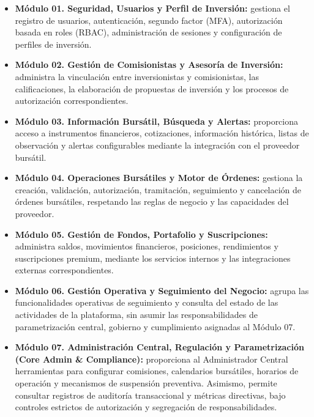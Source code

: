 \documentclass[11pt,a4paper,oneside]{article}
\begin{document}
\begin{itemize}

    \item \textbf{Módulo 01. Seguridad, Usuarios y Perfil
    de Inversión:}
    gestiona el registro de usuarios, autenticación,
    segundo factor (MFA), autorización basada en roles
    (RBAC), administración de sesiones y configuración
    de perfiles de inversión.

    \item \textbf{Módulo 02. Gestión de Comisionistas
    y Asesoría de Inversión:}
    administra la vinculación entre inversionistas
    y comisionistas, las calificaciones, la elaboración
    de propuestas de inversión y los procesos
    de autorización correspondientes.

    \item \textbf{Módulo 03. Información Bursátil,
    Búsqueda y Alertas:}
    proporciona acceso a instrumentos financieros,
    cotizaciones, información histórica, listas de
    observación y alertas configurables mediante
    la integración con el proveedor bursátil.

    \item \textbf{Módulo 04. Operaciones Bursátiles
    y Motor de Órdenes:}
    gestiona la creación, validación, autorización,
    tramitación, seguimiento y cancelación de
    órdenes bursátiles, respetando las reglas
    de negocio y las capacidades del proveedor.

    \item \textbf{Módulo 05. Gestión de Fondos,
    Portafolio y Suscripciones:}
    administra saldos, movimientos financieros,
    posiciones, rendimientos y suscripciones
    premium, mediante los servicios internos
    y las integraciones externas correspondientes.

    \item \textbf{Módulo 06. Gestión Operativa
    y Seguimiento del Negocio:}
    agrupa las funcionalidades operativas de
    seguimiento y consulta del estado de las
    actividades de la plataforma, sin asumir
    las responsabilidades de parametrización
    central, gobierno y cumplimiento asignadas
    al Módulo 07.

    \item \textbf{Módulo 07. Administración Central,
    Regulación y Parametrización
    (Core Admin \& Compliance):}
    proporciona al Administrador Central herramientas
    para configurar comisiones, calendarios bursátiles,
    horarios de operación y mecanismos de suspensión
    preventiva. Asimismo, permite consultar registros
    de auditoría transaccional y métricas directivas,
    bajo controles estrictos de autorización y
    segregación de responsabilidades.


\end{itemize}
\end{document}
